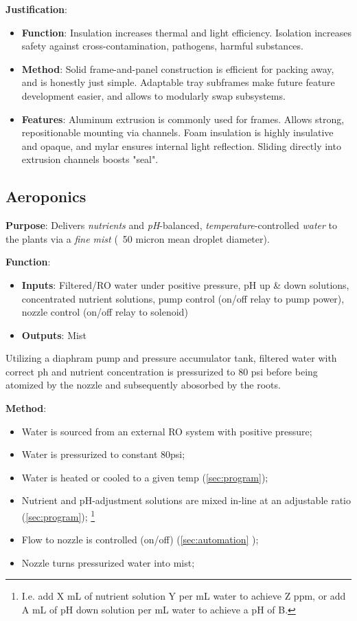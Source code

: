 \documentclass{report}
\begin{document}
\textbf{Justification}: 
\begin{itemize}
    \item \textbf{Function}: Insulation increases thermal and light efficiency. Isolation increases safety against cross-contamination, pathogens, harmful substances.
    \item \textbf{Method}: Solid frame-and-panel construction is efficient for packing away, and is honestly just simple. Adaptable tray subframes make future feature development easier, and allows to modularly swap subsystems.
    \item \textbf{Features}: Aluminum extrusion is commonly used for frames. Allows strong, repositionable mounting via channels. Foam insulation is highly insulative and opaque, and mylar ensures internal light reflection. Sliding directly into extrusion channels boosts "seal".
\end{itemize}

\newpage

\subsection{Aeroponics}
\label{sec:aeroponics}

\textbf{Purpose}: Delivers \textit{nutrients} and \textit{pH}-balanced, \textit{temperature}-controlled \textit{water} to the plants via a \textit{fine mist} (~50 micron mean droplet diameter).

\textbf{Function}:
\begin{itemize}
    \item \textbf{Inputs}: Filtered/RO water under positive pressure, pH up \& down solutions, concentrated nutrient solutions, pump control (on/off relay to pump power), nozzle control (on/off relay to solenoid)
    \item \textbf{Outputs}: Mist
\end{itemize}

Utilizing a diaphram pump and pressure accumulator tank, filtered water with correct ph and nutrient concentration is pressurized to 80 psi before being atomized by the nozzle and subsequently abosorbed by the roots.

\textbf{Method}:
\begin{itemize} 
    \item Water is sourced from an external RO system with positive pressure;
    \item Water is pressurized to constant 80psi;
    \item Water is heated or cooled to a given temp (\ref{sec:program}); %
    \item Nutrient and pH-adjustment solutions are mixed in-line at an adjustable ratio (\ref{sec:program}); \footnote{I.e. add X mL of nutrient solution Y per mL water to achieve Z ppm, or add A mL of pH down solution per mL water to achieve a pH of B.}
    \item Flow to nozzle is controlled (on/off) (\ref{sec:automation}
    );
    \item Nozzle turns pressurized water into mist;
\end{itemize}
\end{document}
